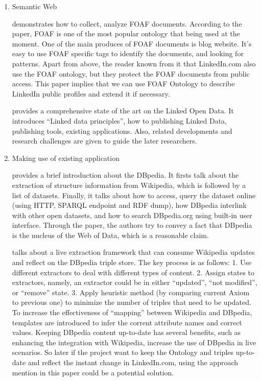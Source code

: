 \begin{enumerate}
\item
Semantic Web

\cite{ding2005} demonstrates how to collect, analyze FOAF documents. According to the paper, FOAF is one of the most popular ontology that being used at the moment. One of the main produces of FOAF documents is blog website. It's easy to use FOAF specific tags to identify the documents, and looking for patterns. Apart from above, the reader known from it that LinkedIn.com also use the FOAF ontology, but they protect the FOAF documents from public access. This paper implies that we can use FOAF Ontology to describe LinkedIn public profiles and extend it if necessary. 

\cite{bizer2009} provides a comprehensive state of the art on the Linked Open Data. It introduces ``Linked data principles'', how to publishing Linked Data, publishing tools, existing applications. Also, related developments and research challenges are given to guide the later researchers.

\item
Making use of existing application

\cite{auer2007} provides a brief introduction about the DBpedia. It firsts talk about the extraction of structure information from Wikipedia, which is followed by a list of datasets. Finally, it talks about how to access, query the dataset online (using HTTP, SPARQL endpoint and RDF dump), how DBpedia interlink with other open datasets, and how to search DBpedia.org using built-in user interface. Through the paper, the authors try to convey a fact that DBpedia is the nucleus of the Web of Data, which is a reasonable claim.

\cite{hellmann2009} talks about a live extraction framework that can consume Wikipedia updates and reflect on the DBpedia triple store. The key process is as follows: 1. Use different extractors to deal with different types of content. 2. Assign states to extractors, namely, an extractor could be in either ``updated'', ``not modified'', or ``remove'' state. 3. Apply heuristic method (by comparing current Axiom to previous one) to minimize the number of triples that need to be updated. To increase the effectiveness of ``mapping'' between Wikipedia and DBpedia, templates are introduced to infer the corrent attribute names and correct values. Keeping DBpedia content up-to-date has several benefits, such as enhancing the integration with Wikipedia, increase the use of DBpedia in live scenarios. So later if the project want to keep the Ontology and triples up-to-date and reflect the instant change in LinkedIn.com, using the approach mention in this paper could be a potential solution.


\end{enumerate}
